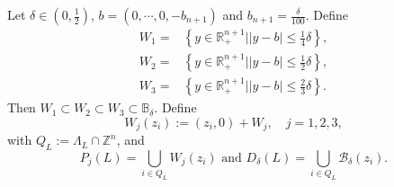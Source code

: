 \documentclass[12pt]{amsart}
\newcommand\R{\ensuremath{\mathbb{R}}}
\newcommand\Z{\ensuremath{\mathbb{Z}}}
\theoremstyle{definition}
\begin{document}
Let $\delta \in (0,\frac{1}{2})$, $b=(0,\cdots ,0,-b_{n+1})$ and $b_{n+1}= \frac{\delta}{100}$. Define
\begin{equation*}
	\begin{aligned}
		W_1=&\left\{y \in \R^{n+1}_+\lvert |y-b|\le \frac{1}{4}\delta\right\}, \\
		W_2=& \left\{y \in \R^{n+1}_+\lvert |y-b|\le \frac{1}{2}\delta\right\}, \\
		W_3=& \left\{y \in \R^{n+1}_+\lvert |y-b|\le \frac{2}{3}\delta\right\}.
	\end{aligned} 
\end{equation*}
Then $W_1\subset W_2\subset W_3\subset \mathbb{B}_{\delta}$. Define
\[
W_j(z_i):=(z_i,0)+W_j, \quad  j=1,2,3,
\]
with $Q_L:= \Lambda_L \cap \Z^{n}$,
and
\[
P_j(L)= \bigcup_{i\in Q_{L}} W_j\left( z_i \right) \text{ and } D_{\delta}(L)=\bigcup_{i\in Q_L} \mathcal{B}_{\delta}(z_i).
\] 
\end{document}

